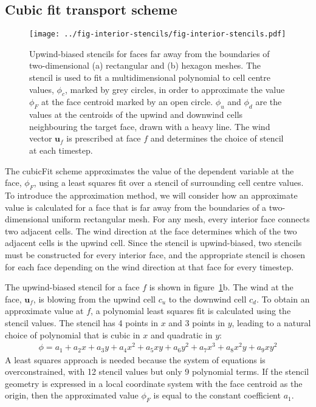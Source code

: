 \subsection{Cubic fit transport scheme}


\begin{figure}
	\centering
	\texttt{[image: ../fig-interior-stencils/fig-interior-stencils.pdf]}
	\caption{Upwind-biased stencils for faces far away from the boundaries of two-dimensional (a) rectangular and (b) hexagon meshes.  The stencil is used to fit a multidimensional polynomial to cell centre values, $\phi_c$, marked by grey circles, in order to approximate the value $\phi_F$ at the face centroid marked by an open circle.  $\phi_u$ and $\phi_d$ are the values at the centroids of the upwind and downwind cells neighbouring the target face, drawn with a heavy line.  The wind vector $\mathbf{u}_f$ is prescribed at face $f$ and determines the choice of stencil at each timestep.}
	\label{fig:interiorStencils}
\end{figure}

The cubicFit scheme approximates the value of the dependent variable at the face, $\phi_F$, using a least squares fit over a stencil of surrounding cell centre values.
To introduce the approximation method, we will consider how an approximate value is calculated for a face that is far away from the boundaries of a two-dimensional uniform rectangular mesh.  For any mesh, every interior face connects two adjacent cells.  The wind direction at the face determines which of the two adjacent cells is the upwind cell.  Since the stencil is upwind-biased, two stencils must be constructed for every interior face, and the appropriate stencil is chosen for each face depending on the wind direction at that face for every timestep.

The upwind-biased stencil for a face $f$ is shown in figure~\ref{fig:interiorStencils}b.  The wind at the face, $\mathbf{u}_f$, is blowing from the upwind cell $c_u$ to the downwind cell $c_d$.
To obtain an approximate value at $f$, a polynomial least squares fit is calculated using the stencil values.
The stencil has \num{4} points in $x$ and \num{3} points in $y$, leading to a natural choice of polynomial that is cubic in $x$ and quadratic in $y$:
\begin{align}
	\phi = a_1 + a_2 x + a_3 y + a_4 x^2 + a_5 xy + a_6 y^2 + a_7 x^3 + a_8 x^2 y + a_9 x y^2 \label{eqn:fullPoly}
\end{align}
A least squares approach is needed because the system of equations is overconstrained, with \num{12} stencil values but only \num{9} polynomial terms.  If the stencil geometry is expressed in a local coordinate system with the face centroid as the origin, then the approximated value $\phi_F$ is equal to the constant coefficient $a_1$.


